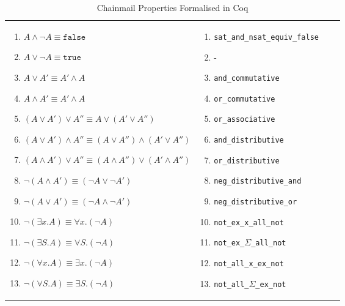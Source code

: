 \begin{table}
\begin{tabular}{|l|l|l|l|}
{\begin{enumerate}[label={(\arabic*)}]
            \item $A \wedge \neg A \equiv \texttt{false}$
            \item $A \vee \neg A \equiv \texttt{true}$
            \item $A \vee A' \equiv A' \wedge A$
            \item $A \wedge A' \equiv A' \wedge A$
            \item $(A \vee A') \vee A'' \equiv A \vee (A' \vee A'')$
            \item $(A \vee A') \wedge A'' \equiv (A \vee A'') \wedge (A' \vee A'')$
            \item $(A \wedge A') \vee A'' \equiv (A \wedge A'') \vee (A' \wedge A'')$
            \item $\neg (A \wedge A') \equiv (\neg A \vee \neg A')$
            \item $\neg (A \vee A') \equiv (\neg A \wedge \neg A')$
            \item $\neg (\exists x.A) \equiv \forall x. (\neg A)$
            \item $\neg (\exists S.A) \equiv \forall S. (\neg A)$
            \item $\neg (\forall x.A) \equiv \exists x. (\neg A)$
            \item $\neg (\forall S.A) \equiv \exists S. (\neg A)$
        \end{enumerate}}
        & 
\parbox{.45\textwidth}{\scriptsize\begin{enumerate}[label={(\arabic*)}]
            \item \texttt{sat\_and\_nsat\_equiv\_false}
            \item -
            \item \texttt{and\_commutative}
            \item \texttt{or\_commutative}
            \item \texttt{or\_associative}
            \item \texttt{and\_distributive}
            \item \texttt{or\_distributive}
            \item \texttt{neg\_distributive\_and}
            \item \texttt{neg\_distributive\_or}
            \item \texttt{not\_ex\_x\_all\_not}
            \item \texttt{not\_ex\_$\Sigma$\_all\_not}
            \item \texttt{not\_all\_x\_ex\_not}
            \item \texttt{not\_all\_$\Sigma$\_ex\_not}
        \end{enumerate}}
\\
\hline
  \end{tabular}
  \caption{Chainmail Properties Formalised in Coq}
  \label{Coq}
\end{table}